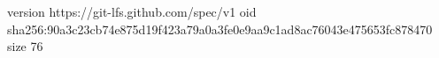 version https://git-lfs.github.com/spec/v1
oid sha256:90a3c23cb74e875d19f423a79a0a3fe0e9aa9c1ad8ac76043e475653fc878470
size 76

